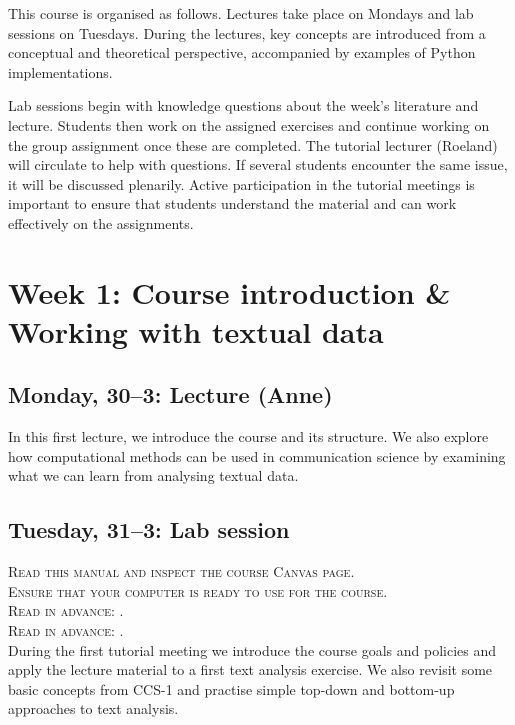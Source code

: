 This course is organised as follows. Lectures take place on Mondays and lab sessions on Tuesdays. During the lectures, key concepts are introduced from a conceptual and theoretical perspective, accompanied by examples of Python implementations.

Lab sessions begin with knowledge questions about the week’s literature and lecture. Students then work on the assigned exercises and continue working on the group assignment once these are completed. The tutorial lecturer (Roeland) will circulate to help with questions. If several students encounter the same issue, it will be discussed plenarily. Active participation in the tutorial meetings is important to ensure that students understand the material and can work effectively on the assignments.

\section*{Week 1: Course introduction \& Working with textual data}

\subsection*{Monday, 30--3: Lecture (Anne)}

In this first lecture, we introduce the course and its structure. We also explore how computational methods can be used in communication science by examining what we can learn from analysing textual data.

\subsection*{Tuesday, 31--3: Lab session}

\textsc{ Read this manual and inspect the course Canvas page.}\\
\textsc{ Ensure that your computer is ready to use for the course.}\\
\textsc{ Read in advance: \cite{vanAtteveldt2018}.}\\
\textsc{ Read in advance: \cite{Boumans2016}.}\\

During the first tutorial meeting we introduce the course goals and policies and apply the lecture material to a first text analysis exercise. We also revisit some basic concepts from CCS-1 and practise simple top-down and bottom-up approaches to text analysis.


